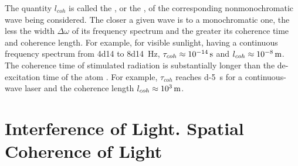 The quantity $l_{coh}$ is called the , or the , of the corresponding nonmonochromatic wave being considered. The closer a given wave is to a monochromatic one, the less the width $\Delta \omega$ of its frequency spectrum and the greater its coherence time and coherence length. For example, for visible sunlight, having a continuous frequency spectrum from \num{4d14} to \SI{8d14}{\hertz}, $\tau_{coh} \approx \SI{d-14}{\second}$ and $l_{coh} \approx \SI{d-8}{\meter}$. The coherence time of stimulated radiation is substantially longer than the de-excitation time of the atom . For example, $\tau_{coh}$ reaches \SI{d-5}{\second} for a continuous-wave laser and the coherence length $l_{coh} \approx \SI{d3}{\meter}$.

\section{Interference of Light. Spatial Coherence of Light}
\label{sec-32.2} 


